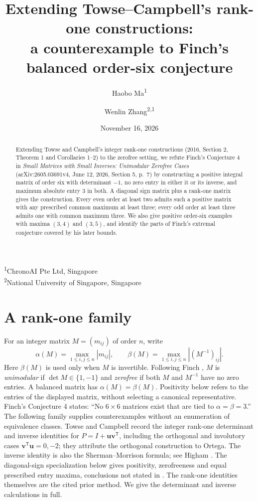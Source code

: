 \documentclass[11pt,a4paper]{article}
\title{Extending Towse--Campbell's rank-one constructions:\\
a counterexample to Finch's balanced order-six conjecture}
\author{Haobo Ma\textsuperscript{1} \and Wenlin Zhang\textsuperscript{2,1}}
\date{November 16, 2026}
\begin{document}
\maketitle
\begin{center}
\small
\textsuperscript{1}ChronoAI Pte Ltd, Singapore\\
\textsuperscript{2}National University of Singapore, Singapore
\end{center}
\begin{abstract}
Extending Towse and Campbell's integer rank-one constructions
(2016, Section 2, Theorem 1 and Corollaries 1--2) to the zerofree setting,
we refute Finch's Conjecture 4 in \emph{Small Matrices with Small Inverses:
Unimodular Zerofree Cases} (arXiv:2605.03691v4, June 12, 2026,
Section 5, p.~7) by constructing
a positive integral matrix of order six with determinant $-1$, no zero
entry in either it or its inverse, and maximum absolute entry $3$ in both.
A diagonal sign matrix
plus a rank-one matrix gives the construction. Every even order at least two admits such
a positive matrix with any prescribed common maximum at least three;
every odd order at least three admits one with common maximum three.
We also give positive order-six examples with maxima $(3,4)$ and $(3,5)$,
and identify the parts of Finch's extremal conjecture covered by his later bounds.
\end{abstract}

\section{A rank-one family}
For an integer matrix $M=(m_{ij})$ of order $n$, write
\[
 \alpha(M)=\max_{1\leq i,j\leq n}|m_{ij}|,
 \qquad
 \beta(M)=\max_{1\leq i,j\leq n}|(M^{-1})_{ij}|.
\]
Here $\beta(M)$ is used only when $M$ is invertible. Following Finch
\cite[pp.~1--2]{finch}, $M$ is \emph{unimodular} if
$\det M\in\{1,-1\}$ and \emph{zerofree} if both $M$ and $M^{-1}$
have no zero entries. A balanced matrix has $\alpha(M)=\beta(M)$.
Positivity below refers to the entries of the displayed matrix, without
selecting a canonical representative.
Finch's Conjecture 4 states: ``No $6\times6$ matrices exist that are
tied to $\alpha=\beta=3$.''
The following family supplies counterexamples without an enumeration
of equivalence classes.
Towse and Campbell \cite[Section 2, Theorem 1 and Corollaries 1--2]{towse}
record the integer rank-one determinant and inverse identities for
$P=I+\mathbf u\mathbf v^{\mathsf T}$, including the orthogonal
and involutory cases $\mathbf v^{\mathsf T}\mathbf u=0,-2$;
they attribute the orthogonal construction to Ortega.
The inverse identity is also the Sherman--Morrison formula; see
Higham \cite[``Sherman--Morrison Formula'']{higham}.
The diagonal-sign specialization below gives positivity, zerofreeness and equal
prescribed entry maxima, conclusions not stated in \cite{towse}.
The rank-one identities themselves are the cited prior method.
We give the determinant and inverse calculations in full.
\end{document}

